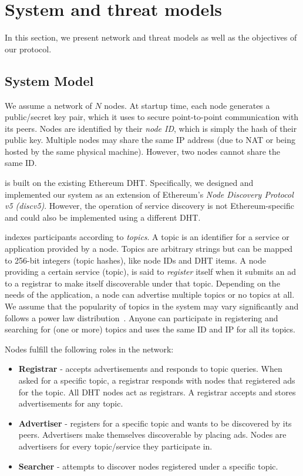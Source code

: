 
\section{System and threat models}
\label{sec:model}
In this section, we present \sysname network and threat models as well as the objectives of our protocol. 

\subsection{System Model}
We assume a network of $N$ nodes. At startup time, each node generates a public/secret key pair, which it uses to secure point-to-point communication with its peers. Nodes are identified by their \emph{node ID}, which is simply the hash of their public key. Multiple nodes may share the same IP address (due to NAT or being hosted by the same physical machine). However, two nodes cannot share the same ID.

\sysname is built on the existing Ethereum DHT. Specifically, we designed and implemented our system as an extension of Ethereum's \emph{Node Discovery Protocol v5 (discv5)}. However, the operation of service discovery is not Ethereum-specific and could also be implemented using a different DHT.

\sysname indexes participants according to \emph{topics}. A topic is an identifier for a
service or application provided by a node. Topics are arbitrary strings but can be mapped to 256-bit integers (topic hashes), like node IDs and DHT items.
A node providing a certain service (topic), is said to \emph{register} itself when it submits an ad to a registrar to make itself discoverable under that topic. Depending on the needs of the application, a node can advertise multiple topics or no topics at all. We assume that the popularity of topics in the system may vary significantly and follows a power law distribution~\cite{kim2018measuring}. Anyone can participate in registering and searching for (one or more) topics and uses the same ID and IP for all its topics. 

Nodes fulfill the following roles in the network:

\begin{itemize}
    \item \textbf{Registrar} - accepts advertisements and responds to topic queries. When asked for a specific topic, a registrar responds with nodes that registered ads for the topic.  All DHT nodes act as registrars. A registrar accepts and stores advertisements for any topic.
    \item \textbf{Advertiser} - registers for a specific topic and wants to be discovered by its peers. Advertisers make themselves discoverable by placing ads. Nodes are advertisers for every topic/service they participate in.
    \item \textbf{Searcher} - attempts to discover nodes registered under a specific topic.
\end{itemize}

